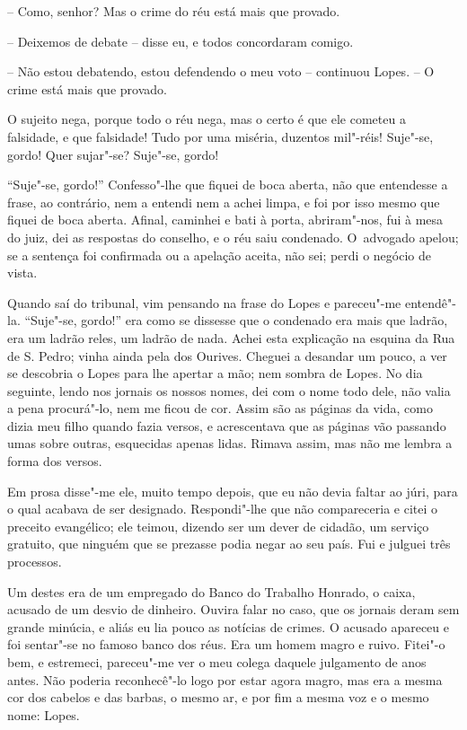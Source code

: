 -- Como, senhor? Mas o crime do réu está mais que provado.

-- Deixemos de debate -- disse eu, e todos concordaram comigo.

-- Não estou debatendo, estou defendendo o meu voto -- continuou Lopes.
-- O crime está mais que provado.

O sujeito nega, porque todo o réu nega, mas o certo é que ele cometeu a
falsidade, e que falsidade! Tudo por uma miséria, duzentos mil"-réis!
Suje"-se, gordo! Quer sujar"-se? Suje"-se, gordo!

``Suje"-se, gordo!'' Confesso"-lhe que fiquei de boca aberta, não que
entendesse a frase, ao contrário, nem a entendi nem a achei limpa, e foi
por isso mesmo que fiquei de boca aberta. Afinal, caminhei e bati à
porta, abriram"-nos, fui à mesa do juiz, dei as respostas do conselho, e
o réu saiu condenado. O~advogado apelou; se a sentença foi confirmada ou
a apelação aceita, não sei; perdi o negócio de vista.

Quando saí do tribunal, vim pensando na frase do Lopes e pareceu"-me
entendê"-la. ``Suje"-se, gordo!'' era como se dissesse que o condenado era
mais que ladrão, era um ladrão reles, um ladrão de nada. Achei esta
explicação na esquina da Rua de S. Pedro; vinha ainda pela dos Ourives.
Cheguei a desandar um pouco, a ver se descobria o Lopes para lhe apertar
a mão; nem sombra de Lopes. No dia seguinte, lendo nos jornais os nossos
nomes, dei com o nome todo dele, não valia a pena procurá"-lo, nem me
ficou de cor. Assim são as páginas da vida, como dizia meu filho quando
fazia versos, e acrescentava que as páginas vão passando umas sobre
outras, esquecidas apenas lidas. Rimava assim, mas não me lembra a forma
dos versos.

Em prosa disse"-me ele, muito tempo depois, que eu não devia faltar ao
júri, para o qual acabava de ser designado. Respondi"-lhe que não
compareceria e citei o preceito evangélico; ele teimou, dizendo ser um
dever de cidadão, um serviço gratuito, que ninguém que se prezasse podia
negar ao seu país. Fui e julguei três processos.

Um destes era de um empregado do Banco do Trabalho Honrado, o caixa,
acusado de um desvio de dinheiro. Ouvira falar no caso, que os jornais
deram sem grande minúcia, e aliás eu lia pouco as notícias de crimes. O
acusado apareceu e foi sentar"-se no famoso banco dos réus. Era um homem
magro e ruivo. Fitei"-o bem, e estremeci, pareceu"-me ver o meu colega
daquele julgamento de anos antes. Não poderia reconhecê"-lo logo por
estar agora magro, mas era a mesma cor dos cabelos e das barbas, o mesmo
ar, e por fim a mesma voz e o mesmo nome: Lopes.

